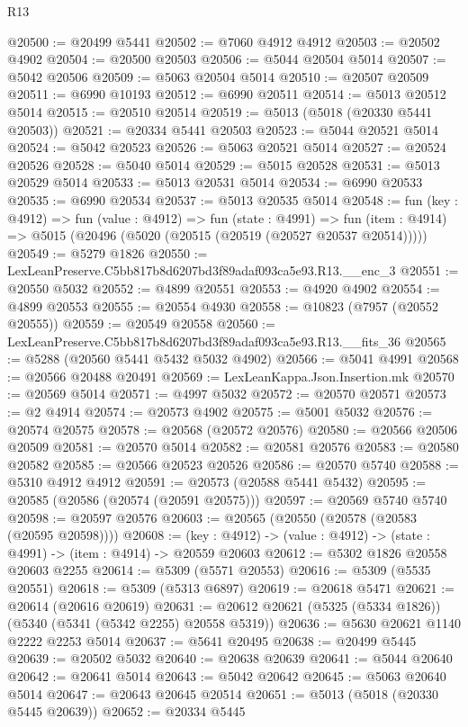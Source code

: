 \begin{lexlean}{R13}
\begin{coremodule}
@20500 := @20499 @5441
@20502 := @7060 @4912 @4912
@20503 := @20502 @4902
@20504 := @20500 @20503
@20506 := @5044 @20504 @5014
@20507 := @5042 @20506
@20509 := @5063 @20504 @5014
@20510 := @20507 @20509
@20511 := @6990 @10193
@20512 := @6990 @20511
@20514 := @5013 @20512 @5014
@20515 := @20510 @20514
@20519 := @5013 (@5018 (@20330 @5441 @20503))
@20521 := @20334 @5441 @20503
@20523 := @5044 @20521 @5014
@20524 := @5042 @20523
@20526 := @5063 @20521 @5014
@20527 := @20524 @20526
@20528 := @5040 @5014
@20529 := @5015 @20528
@20531 := @5013 @20529 @5014
@20533 := @5013 @20531 @5014
@20534 := @6990 @20533
@20535 := @6990 @20534
@20537 := @5013 @20535 @5014
@20548 := fun (key : @4912) =>
  fun (value : @4912) =>
  fun (state : @4991) =>
  fun (item : @4914) => @5015 (@20496 (@5020 (@20515 (@20519 (@20527 @20537 @20514)))))
@20549 := @5279 @1826
@20550 := LexLeanPreserve.C5bb817b8d6207bd3f89adaf093ca5e93.R13.__enc_3
@20551 := @20550 @5032
@20552 := @4899 @20551
@20553 := @4920 @4902
@20554 := @4899 @20553
@20555 := @20554 @4930
@20558 := @10823 (@7957 (@20552 @20555))
@20559 := @20549 @20558
@20560 := LexLeanPreserve.C5bb817b8d6207bd3f89adaf093ca5e93.R13.__fits_36
@20565 := @5288 (@20560 @5441 @5432 @5032 @4902)
@20566 := @5041 @4991
@20568 := @20566 @20488 @20491
@20569 := LexLeanKappa.Json.Insertion.mk
@20570 := @20569 @5014
@20571 := @4997 @5032
@20572 := @20570 @20571
@20573 := @2 @4914
@20574 := @20573 @4902
@20575 := @5001 @5032
@20576 := @20574 @20575
@20578 := @20568 (@20572 @20576)
@20580 := @20566 @20506 @20509
@20581 := @20570 @5014
@20582 := @20581 @20576
@20583 := @20580 @20582
@20585 := @20566 @20523 @20526
@20586 := @20570 @5740
@20588 := @5310 @4912 @4912
@20591 := @20573 (@20588 @5441 @5432)
@20595 := @20585 (@20586 (@20574 (@20591 @20575)))
@20597 := @20569 @5740 @5740
@20598 := @20597 @20576
@20603 := @20565 (@20550 (@20578 (@20583 (@20595 @20598))))
@20608 := (key : @4912) -> (value : @4912) -> (state : @4991) -> (item : @4914) -> @20559 @20603
@20612 := @5302 @1826 @20558 @20603 @2255
@20614 := @5309 (@5571 @20553)
@20616 := @5309 (@5535 @20551)
@20618 := @5309 (@5313 @6897)
@20619 := @20618 @5471
@20621 := @20614 (@20616 @20619)
@20631 := @20612 @20621 (@5325 (@5334 @1826)) (@5340 (@5341 (@5342 @2255) @20558 @5319))
@20636 := @5630 @20621 @1140 @2222 @2253 @5014
@20637 := @5641 @20495
@20638 := @20499 @5445
@20639 := @20502 @5032
@20640 := @20638 @20639
@20641 := @5044 @20640
@20642 := @20641 @5014
@20643 := @5042 @20642
@20645 := @5063 @20640 @5014
@20647 := @20643 @20645 @20514
@20651 := @5013 (@5018 (@20330 @5445 @20639))
@20652 := @20334 @5445

\end{coremodule}
\end{lexlean}
